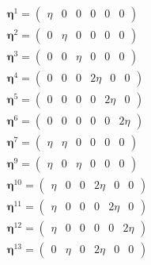 \documentclass[showpacs,aps,floatfix,prb,reprint,superscriptaddress,onecolumn]{revtex4-1}
\begin{document}
\begin{enumerate}
\begin{subequations}
\label{eqn:strainstates} 
\begin{align}
        \bm{\eta}^1 =\left(\begin{matrix} \eta & 0 & 0 & 0 & 0 & 0 \end{matrix}\right)\\
	\bm{\eta}^2 =\left(\begin{matrix} 0 & \eta & 0 & 0 & 0 & 0 \end{matrix}\right)\\
	\bm{\eta}^3 =\left(\begin{matrix} 0 & 0 & \eta & 0 & 0 & 0 \end{matrix}\right)\\
    	\bm{\eta}^4 =\left(\begin{matrix} 0 & 0 & 0 & 2\eta & 0 & 0 \end{matrix}\right)\\
    	\bm{\eta}^5 =\left(\begin{matrix} 0 & 0 & 0 & 0 & 2\eta & 0 \end{matrix}\right)\\
    	\bm{\eta}^6 =\left(\begin{matrix} 0 & 0 & 0 & 0 & 0 & 2\eta \end{matrix}\right)\\
    	\bm{\eta}^7 =\left(\begin{matrix} \eta & \eta & 0 & 0 & 0 & 0 \end{matrix}\right)\\
    	\bm{\eta}^9 =\left(\begin{matrix} \eta & 0 & \eta & 0 & 0 & 0 \end{matrix}\right)\\
    	\bm{\eta}^{10} =\left(\begin{matrix} \eta & 0 & 0 & 2\eta & 0 & 0 \end{matrix}\right)\\
    	\bm{\eta}^{11} =\left(\begin{matrix} \eta & 0 & 0 & 0 & 2\eta & 0 \end{matrix}\right)\\
    	\bm{\eta}^{12} =\left(\begin{matrix} \eta & 0 & 0 & 0 & 0 & 2\eta \end{matrix}\right)\\
    	\bm{\eta}^{13} =\left(\begin{matrix} 0 & \eta & 0 & 2\eta & 0 & 0 \end{matrix}\right)\\

\end{align}
\end{subequations}
\end{enumerate}
\end{document}

